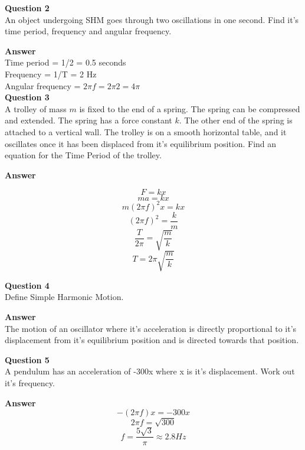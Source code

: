 \documentclass{article}
\begin{document}
\textbf{Question 2}\\
An object undergoing SHM goes through two oscillations in one second. Find it's time period, frequency and angular frequency.

\textbf{Answer}\\
Time period = 1/2 = 0.5 seconds\\
Frequency = 1/T = 2 Hz\\
Angular frequency = $2 \pi f = 2 \pi 2 = 4 \pi$\\

\textbf{Question 3}\\
A trolley of mass $m$ is fixed to the end of a spring. The spring can be compressed and extended. The spring has a force constant $k$. The other end of the spring is attached to a vertical wall. The trolley is on a smooth horizontal table, and it oscillates once it has been displaced from it's equilibrium position. Find an equation for the Time Period of the trolley.

\textbf{Answer}\\
\begin{multicols}{2}
\[
	F = kx
\]
\[
	ma = kx
\]
\[
	m(2 \pi f)^2x = kx
\]
\[
	(2 \pi f)^2 = \frac{k}{m}
\]
\[
	\frac{T}{2 \pi} = \sqrt{\frac{m}{k}}
\]
\[
	T = 2 \pi \sqrt{\frac{m}{k}}
\]
\end{multicols}

\textbf{Question 4}\\
Define Simple Harmonic Motion.

\textbf{Answer}\\
The motion of an oscillator where it's acceleration is directly proportional to it's displacement from it's equilibrium position and is directed towards that position.

\textbf{Question 5}\\
A pendulum has an acceleration of -300x where x is it's displacement. Work out it's frequency.

\textbf{Answer}\\
\[
	-(2 \pi f)x = -300x
\]
\[
	2 \pi f = \sqrt{300}
\]
\[
	f = \frac{5\sqrt{3}}{\pi} \approx 2.8Hz
\]
\end{document}
